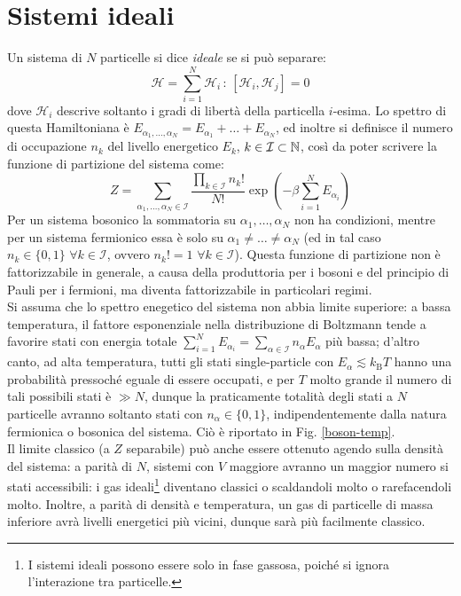 \section{Sistemi ideali}

Un sistema di $ N $ particelle si dice \textit{ideale} se si può separare:
\begin{equation}
	\mathcal{H} = \sum_{i = 1}^N \mathcal{H}_i \,:\, [\mathcal{H}_i , \mathcal{H}_j] = 0
\end{equation}
dove $ \mathcal{H}_i $ descrive soltanto i gradi di libertà della particella $ i $-esima. Lo spettro di questa Hamiltoniana è $ E_{\alpha_1, \dots, \alpha_N} = E_{\alpha_1} + \dots + E_{\alpha_N} $, ed inoltre si definisce il numero di occupazione $ n_k $ del livello energetico $ E_k $, $ k \in \mathcal{I} \subset \mathbb{N} $, così da poter scrivere la funzione di partizione del sistema come:
\begin{equation}
	Z = \sum_{\alpha_1, \dots, \alpha_N \in \mathcal{I}} \frac{\prod_{k \in \mathcal{I}} n_k!}{N!} \exp \left( - \beta \sum_{i = 1}^N E_{\alpha_i} \right)
	\label{eq:z-sing-part}
\end{equation}
Per un sistema bosonico la sommatoria su $ \alpha_1, \dots, \alpha_N $ non ha condizioni, mentre per un sistema fermionico essa è solo su $ \alpha_1 \neq \dots \neq \alpha_N $ (ed in tal caso $ n_k \in \{0,1\} \,\,\forall k \in \mathcal{I} $, ovvero $ n_k! = 1 \,\,\forall k \in \mathcal{I} $). Questa funzione di partizione non è fattorizzabile in generale, a causa della produttoria per i bosoni e del principio di Pauli per i fermioni, ma diventa fattorizzabile in particolari regimi. \\
Si assuma che lo spettro enegetico del sistema non abbia limite superiore: a bassa temperatura, il fattore esponenziale nella distribuzione di Boltzmann tende a favorire stati con energia totale $ \sum_{i = 1}^N E_{\alpha_i} = \sum_{\alpha \in \mathcal{I}} n_\alpha E_\alpha $ più bassa; d'altro canto, ad alta temperatura, tutti gli stati single-particle con $ E_\alpha \lesssim k_\text{B} T $ hanno una probabilità pressoché eguale di essere occupati, e per $ T $ molto grande il numero di tali possibili stati è $ \gg N $, dunque la praticamente totalità degli stati a $ N $ particelle avranno soltanto stati con $ n_\alpha \in \{0,1\} $, indipendentemente dalla natura fermionica o bosonica del sistema. Ciò è riportato in Fig. \ref{boson-temp}. \\
Il limite classico (a $ Z $ separabile) può anche essere ottenuto agendo sulla densità del sistema: a parità di $ N $, sistemi con $ V $ maggiore avranno un maggior numero si stati accessibili: i gas ideali\footnote{I sistemi ideali possono essere solo in fase gassosa, poiché si ignora l'interazione tra particelle.} diventano classici o scaldandoli molto o rarefacendoli molto. Inoltre, a parità di densità e temperatura, un gas di particelle di massa inferiore avrà livelli energetici più vicini, dunque sarà più facilmente classico.

